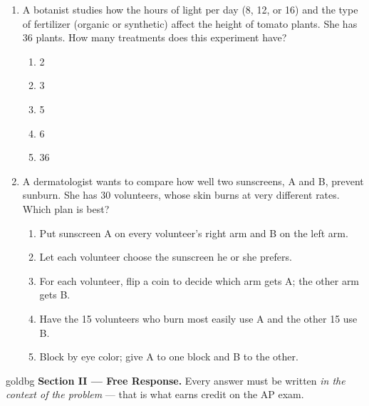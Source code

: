 \documentclass[12pt]{article}
\begin{document}
\begin{enumerate}[leftmargin=1.9em, itemsep=0.10in]

  \item A botanist studies how the hours of light per day (8, 12, or 16) and the type of
        fertilizer (organic or synthetic) affect the height of tomato plants. She has 36
        plants. How many treatments does this experiment have?
        \begin{enumerate}[label=\textbf{(\Alph*)}, leftmargin=2.2em, itemsep=1pt]
          \item 2
          \item 3
          \item 5
          \item 6
          \item 36
                \hfill{}\rule[-0.2in]{0pt}{0.48in}
        \end{enumerate}

  \item A dermatologist wants to compare how well two sunscreens, A and B, prevent sunburn.
        She has 30 volunteers, whose skin burns at very different rates. Which plan is best?
        \begin{enumerate}[label=\textbf{(\Alph*)}, leftmargin=2.2em, itemsep=1pt]
          \item Put sunscreen A on every volunteer's right arm and B on the left arm.
          \item Let each volunteer choose the sunscreen he or she prefers.
          \item For each volunteer, flip a coin to decide which arm gets A; the other arm
                gets B.
          \item Have the 15 volunteers who burn most easily use A and the other 15 use B.
          \item Block by eye color; give A to one block and B to the other.
                \hfill{}\rule[-0.2in]{0pt}{0.48in}
        \end{enumerate}

\end{enumerate}

\vspace{0.08in}

\boxguard[27]
\begin{headlinebox}{goldbg}
\small
\textbf{Section II --- Free Response.} Every answer must be written \emph{in the context of the
problem} --- that is what earns credit on the AP exam.
\end{headlinebox}
\end{document}
